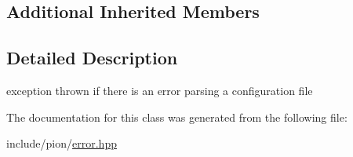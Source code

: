 \subsection*{Additional Inherited Members}


\subsection{Detailed Description}
exception thrown if there is an error parsing a configuration file 

The documentation for this class was generated from the following file\-:\begin{DoxyCompactItemize}
\item 
include/pion/\hyperlink{error_8hpp}{error.\-hpp}\end{DoxyCompactItemize}
